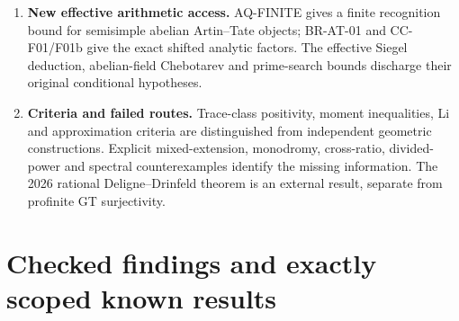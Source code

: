 \documentclass[11pt,a4paper]{article}
\theoremstyle{definition}\newtheorem{definition}[theorem]{Definition}
\theoremstyle{remark}\newtheorem{remark}[theorem]{Remark}
\begin{document}
\begin{enumerate}
and the integral non-strict questions, remain.
\item \textbf{New effective arithmetic access.} AQ-FINITE gives a
finite recognition bound for semisimple abelian Artin--Tate objects;
BR-AT-01 and CC-F01/F01b give the exact shifted analytic factors.
The effective Siegel deduction, abelian-field Chebotarev and prime-search
bounds discharge their original conditional hypotheses.
\item \textbf{Criteria and failed routes.} Trace-class positivity,
moment inequalities, Li and approximation criteria are distinguished
from independent geometric constructions. Explicit mixed-extension,
monodromy, cross-ratio, divided-power and spectral counterexamples
identify the missing information. The 2026 rational Deligne--Drinfeld
theorem is an external result, separate from profinite GT surjectivity.
\end{enumerate}
\tableofcontents
\clearpage
\part{Checked findings and exactly scoped known results}
\end{document}
